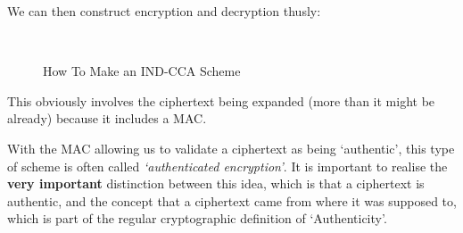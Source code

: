     We can then construct encryption and decryption thusly:
    \begin{figure}[htp!]
    \centering
    ~
    \caption{How To Make an IND-CCA Scheme}
    \label{fig:ind-cca-ed}
    \end{figure}

    This obviously involves the ciphertext being expanded (more than it might be already) because it includes a MAC. 

    With the MAC allowing us to validate a ciphertext as being `authentic', this type of scheme is often called \emph{`authenticated encryption'}.
    It is important to realise the \textbf{very important} distinction between this idea, which is that a ciphertext is authentic, and the concept that a ciphertext came from where it was supposed to, which is part of the regular cryptographic definition of `Authenticity'.

